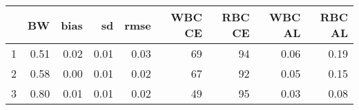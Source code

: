 \begin{table}[ht]
\centering
\begin{tabular}{rrrrrrrrr}
  \hline
 & BW & bias & sd & rmse & WBC CE & RBC CE & WBC AL & RBC AL \\
  \hline
1 & 0.51 & 0.02 & 0.01 & 0.03 & 69 & 94 & 0.06 & 0.19 \\
  2 & 0.58 & 0.00 & 0.01 & 0.02 & 67 & 92 & 0.05 & 0.15 \\
  3 & 0.80 & 0.01 & 0.01 & 0.02 & 49 & 95 & 0.03 & 0.08 \\
   \hline
\end{tabular}
\end{table}
